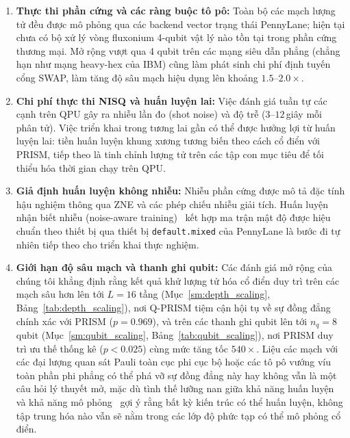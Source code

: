 \documentclass[10pt,twocolumn,letterpaper]{article}
\begin{document}
\begin{enumerate}
    \item \textbf{Thực thi phần cứng và các ràng buộc tô pô:} Toàn bộ các mạch lượng tử đều được mô phỏng qua các backend vector trạng thái PennyLane; hiện tại chưa có bộ xử lý vòng fluxonium 4-qubit vật lý nào tồn tại trong phần cứng thương mại. Mở rộng vượt qua 4 qubit trên các mạng siêu dẫn phẳng (chẳng hạn như mạng heavy-hex của IBM) cũng làm phát sinh chi phí định tuyến cổng SWAP, làm tăng độ sâu mạch hiệu dụng lên khoảng $1.5$--$2.0\times$.
    \item \textbf{Chi phí thực thi NISQ và huấn luyện lai:} Việc đánh giá tuần tự các cạnh trên QPU gây ra nhiễu lần đo (shot noise) và độ trễ ($3$--$12$\,giây mỗi phân tử). Việc triển khai trong tương lai gần có thể được hưởng lợi từ huấn luyện lai: tiền huấn luyện khung xương tương biến theo cách cổ điển với PRISM, tiếp theo là tinh chỉnh lượng tử trên các tập con mục tiêu để tối thiểu hóa thời gian chạy trên QPU.
    \item \textbf{Giả định huấn luyện không nhiễu:} Nhiễu phần cứng được mô tả đặc tính hậu nghiệm thông qua ZNE và các phép chiếu nhiễu giải tích. Huấn luyện nhận biết nhiễu (noise-aware training)~\cite{cincio2021machine, Sharma:2020qjq} kết hợp ma trận mật độ được hiệu chuẩn theo thiết bị qua thiết bị \texttt{default.mixed} của PennyLane là bước đi tự nhiên tiếp theo cho triển khai thực nghiệm.
    \item \textbf{Giới hạn độ sâu mạch và thanh ghi qubit:} Các đánh giá mở rộng của chúng tôi khẳng định rằng kết quả khử lượng tử hóa cổ điển duy trì trên các mạch sâu hơn lên tới $L = 16$ tầng (Mục~\ref{sm:depth_scaling}, Bảng~\ref{tab:depth_scaling}), nơi Q-PRISM tiệm cận hội tụ về sự đồng đẳng chính xác với PRISM ($p = 0.969$), và trên các thanh ghi qubit lên tới $n_q = 8$ qubit (Mục~\ref{sm:qubit_scaling}, Bảng~\ref{tab:qubit_scaling}), nơi PRISM duy trì ưu thế thống kê ($p < 0.025$) cùng mức tăng tốc $540\times$. Liệu các mạch với các đại lượng quan sát Pauli toàn cục phi cục bộ hoặc các tô pô vướng víu toàn phần phi phẳng có thể phá vỡ sự đồng đẳng này hay không vẫn là một câu hỏi lý thuyết mở, mặc dù tình thế lưỡng nan giữa khả năng huấn luyện và khả năng mô phỏng~\cite{Cerezo:2023nqf} gợi ý rằng bất kỳ kiến trúc có thể huấn luyện, không tập trung hóa nào vẫn sẽ nằm trong các lớp độ phức tạp có thể mô phỏng cổ điển.
\end{enumerate}



\end{document}
